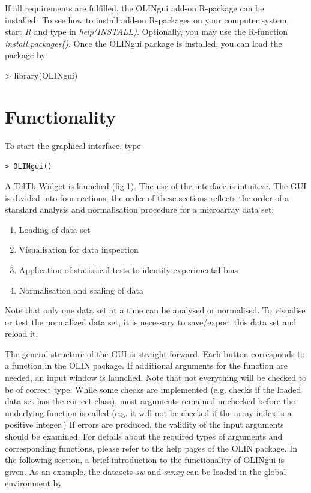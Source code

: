 \documentclass[a4paper,11pt]{article}
\begin{document}
If all requirements are fulfilled, the OLINgui add-on R-package can be installed.\
 To see how to install add-on R-packages on your computer system, start \textit{R} 
and type in \textit{help(INSTALL)}.
Optionally, you may use the R-function \textit{install.packages()}. 
Once the OLINgui package is installed, you can load the package by 

\begin{Schunk}
\begin{Sinput}
> library(OLINgui)
\end{Sinput}
\end{Schunk}




\section{Functionality}

To start the graphical interface, type: 


\vspace{4mm}
\noindent \texttt{> OLINgui()}
\vspace{4mm}





A TclTk-Widget is launched (fig.1). The use of the interface is intuitive. The
GUI is divided into four sections; the order of these sections reflects the order
of a standard analysis and normalisation  procedure for a  microarray data set:
\begin{enumerate}
\item Loading of data set
\item Visualisation for data inspection
\item Application of statistical tests to identify experimental bias
\item Normalisation and scaling of data 
\end{enumerate} 

Note that only one data set at a time can be analysed or normalised. To visualise
or test the normalized data set, it is necessary to save/export this data set and
reload it. 

The general structure of the GUI is straight-forward.  Each button corresponds to a function in the OLIN package. 
If additional arguments for the function are needed,
 an input  window is launched.
Note that not everything will be checked to be of correct type.
 While some checks are implemented (e.g. checks if the loaded data set
has the correct class), most arguments remained unchecked before the underlying 
function is called (e.g. it will not be checked if the array index is a positive integer.)
If errors are produced, the validity of the input arguments should be examined.
For details about the required types of arguments and corresponding functions, please refer to the help pages of the OLIN package. In the following section, a brief introduction to
the functionality of OLINgui is given. As an example, the datasets \textit{sw} and
\textit{sw.xy} can be loaded in the global environment by
\end{document}
